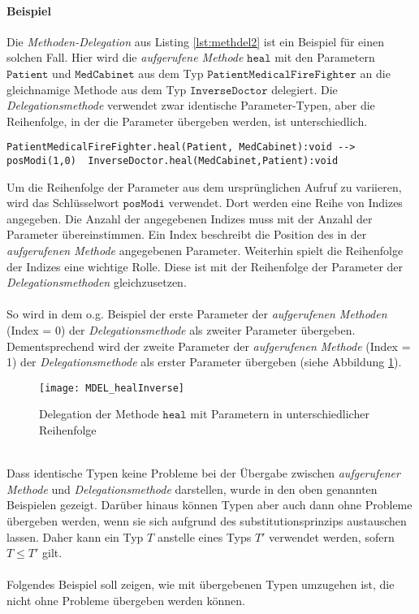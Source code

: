 \paragraph{Beispiel} Die \emph{Methoden-Delegation} aus Listing \ref{lst:methdel2} ist ein Beispiel für einen solchen Fall. Hier wird die \emph{aufgerufene Methode} $\texttt{heal}$ mit den Parametern $\texttt{Patient}$ und $\texttt{MedCabinet}$ aus dem Typ $\texttt{PatientMedicalFireFighter}$ an die gleichnamige Methode aus dem Typ $\texttt{InverseDoctor}$ delegiert. Die \emph{Delegationsmethode} verwendet zwar identische Parameter-Typen, aber die Reihenfolge, in der die Parameter übergeben werden, ist unterschiedlich.
\begin{lstlisting}[style = dsl, caption = Methoden-Delegation mit Parametern in unterschiedlicher Reihenfolge, captionpos = b]
	PatientMedicalFireFighter.heal(Patient, MedCabinet):void --> posModi(1,0)  InverseDoctor.heal(MedCabinet,Patient):void
\end{lstlisting}\label{lst:methdel2}
\noindent
Um die Reihenfolge der Parameter aus dem ursprünglichen Aufruf zu variieren, wird das Schlüsselwort $\texttt{posModi}$ verwendet. Dort werden eine Reihe von Indizes angegeben. Die Anzahl der angegebenen Indizes muss mit der Anzahl der Parameter übereinstimmen. Ein Index beschreibt die Position des in der \emph{aufgerufenen Methode} angegebenen Parameter. Weiterhin spielt die Reihenfolge der Indizes eine wichtige Rolle. Diese ist mit der Reihenfolge der Parameter der \emph{Delegationsmethoden} gleichzusetzen.
\\\\
So wird in dem o.g. Beispiel der erste Parameter der \emph{aufgerufenen Methoden} (Index = 0) der \emph{Delegationsmethode} als zweiter Parameter übergeben. Dementsprechend wird der zweite Parameter der \emph{aufgerufenen Methode} (Index = 1) der \emph{Delegationsmethode} als erster Parameter übergeben (siehe Abbildung \ref{fig:DEL_healInverse}). 
\begin{figure}[H]
\texttt{[image: MDEL\_healInverse]}
\caption{Delegation der Methode $\texttt{heal}$ mit Parametern in unterschiedlicher Reihenfolge}
\label{fig:DEL_healInverse}
\end{figure}
\noindent
\\
Dass identische Typen keine Probleme bei der Übergabe zwischen \emph{aufgerufener Methode} und \emph{Delegationsmethode} darstellen, wurde in den oben genannten Beispielen gezeigt.
Darüber hinaus können Typen aber auch dann ohne Probleme übergeben werden, wenn sie sich aufgrund des \Gls{substitutionsprinzip}s austauschen lassen. Daher kann ein Typ $T$ anstelle eines Typs $T'$ verwendet werden, sofern $T \leq T'$ gilt.
\\\\
Folgendes Beispiel soll zeigen, wie mit übergebenen Typen umzugehen ist, die nicht ohne Probleme übergeben werden können.
\\\\
